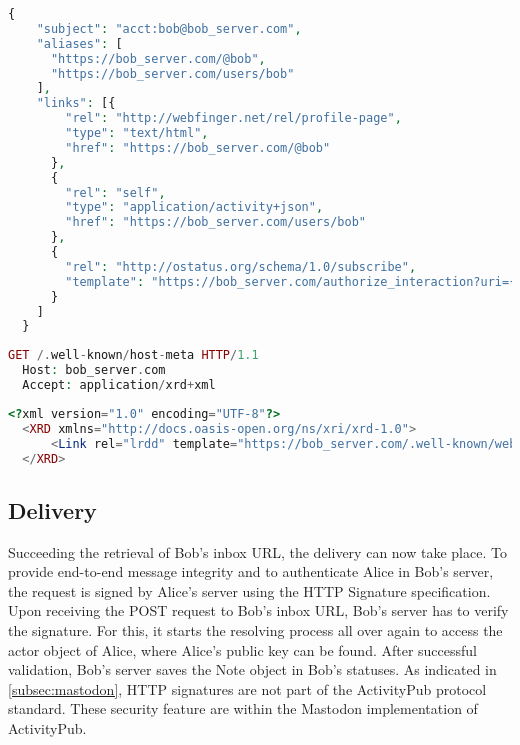 \lstset{style=JSONStyle}
\begin{lstlisting}[language=PHP, caption=Webfinger response, label=fig:webfinger_response, float=h]
  {
    "subject": "acct:bob@bob_server.com",
    "aliases": [
      "https://bob_server.com/@bob",
      "https://bob_server.com/users/bob"
    ],
    "links": [{
        "rel": "http://webfinger.net/rel/profile-page",
        "type": "text/html",
        "href": "https://bob_server.com/@bob"
      },
      {
        "rel": "self",
        "type": "application/activity+json",
        "href": "https://bob_server.com/users/bob"
      },
      {
        "rel": "http://ostatus.org/schema/1.0/subscribe",
        "template": "https://bob_server.com/authorize_interaction?uri={uri}"
      }
    ]
  }
\end{lstlisting}

\begin{lstlisting}[language=PHP, caption=Hostmeta request, label=fig:hostmeta_request, float=h]
  GET /.well-known/host-meta HTTP/1.1
  Host: bob_server.com
  Accept: application/xrd+xml
\end{lstlisting}

\lstset{style=JSONStyle}
\begin{lstlisting}[language=PHP,caption=Hostmeta response, label=fig:hostmeta_response, float=h]
  <?xml version="1.0" encoding="UTF-8"?>
  <XRD xmlns="http://docs.oasis-open.org/ns/xri/xrd-1.0">
      <Link rel="lrdd" template="https://bob_server.com/.well-known/webfinger?resource={uri}"/>
  </XRD>
\end{lstlisting} 

\subsection{Delivery}
Succeeding the retrieval of Bob's inbox URL, the delivery can now take place. To provide end-to-end message integrity and to authenticate Alice in Bob's server, the request is signed by Alice's server using the HTTP Signature specification. Upon receiving the POST request to Bob's inbox URL, Bob's server has to verify the signature. For this, it starts the resolving process all over again to access the actor object of Alice, where Alice's public key can be found. After successful validation, Bob's server saves the Note object in Bob's statuses.
As indicated in \autoref{subsec:mastodon}, HTTP signatures are not part of the ActivityPub protocol standard. These security feature are within the Mastodon implementation of ActivityPub.

